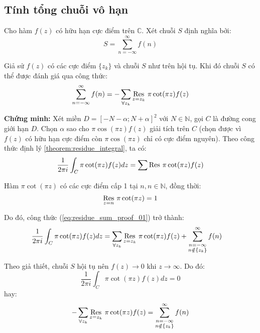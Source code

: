 \subsection{Tính tổng chuỗi vô hạn}%
\label{sub:tính_tổng_chuỗi_vô_hạn}

Cho hàm $f(z)$ có hữu hạn cực điểm trên $\mathbb C$. Xét chuỗi $S$ định nghĩa bởi:
\begin{equation}
	\label{eq:infsum_sum}
	S = \sum_{n = -\infty}^{\infty} f(n)
\end{equation}

\begin{theorem}
	\label{theorem:residue_sum}
	Giả sử $f(z)$ có các cực điểm $\{z_k\}$ và chuỗi $S$ như trên hội tụ. Khi đó chuỗi $S$ có thể được đánh giá qua công thức:
	\begin{equation*}
		\sum_{n = -\infty}^{\infty} f(n) = - \sum_{\forall z_k} \Res{\pi \cot(\pi z)f(z)}{z=z_k}
	\end{equation*}
\end{theorem}

\textbf{Chứng minh:} Xét miền $D = [-N-\alpha; N + \alpha]^2$ với $N \in \mathbb N$, gọi $C$ là đường cong giới hạn $D$. Chọn $\alpha$ sao cho $\pi\cos(\pi z)f(z)$ giải tích trên $C$ (chọn được vì $f(z)$ có hữu hạn cực điểm còn $\pi\cos(\pi z)$ chỉ có cực điểm nguyên). Theo công thức định lý \ref{theorem:residue_integral}, ta có:
\begin{equation}
	\label{eq:residue_sum_proof_01}
	\frac{1}{2\pi i}\int_C \pi \cot(\pi z)f(z) dz = \sum \Res{\pi \cot(\pi z) f(z)}{}
\end{equation}

Hàm $\pi \cot(\pi z)$ có các cực điểm cấp 1 tại $n, n\in\mathbb N$, đồng thời:
\begin{equation}
	\label{eq:residue_sum_proof_02}
	\Res{\pi\cot(\pi z)}{z=n} = 1
\end{equation}

Do đó, công thức (\ref{eq:residue_sum_proof_01}) trở thành:
\begin{align}
	\label{eq:residue_sum_proof_03}
	\frac{1}{2\pi i}\int_C \pi \cot(\pi z)f(z) dz &= \sum_{\forall z_k} \Res{\pi \cot(\pi z) f(z)}{z=z_k} + \sum_{\substack{n = -\infty\\n\notin \{z_k\}}}^{\infty} f(n)
\end{align}

Theo giả thiết, chuỗi $S$ hội tụ nên $f(z) \to 0$ khi $z\to \infty$. Do đó:
\begin{equation}
	\frac{1}{2\pi i}\int_C \pi \cot(\pi z)f(z) dz = 0
\end{equation}
hay:
\begin{equation}
	-\sum_{\forall z_k} \Res{\pi \cot(\pi z) f(z)}{z=z_k} = \sum_{\substack{n = -\infty\\n\notin \{z_k\}}}^{\infty} f(n)
\end{equation}

